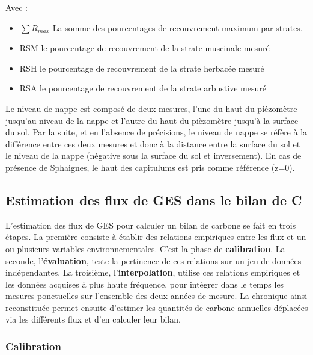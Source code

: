 Avec :
\begin{itemize}
\item $\sum R_{max}$ La somme des pourcentages de recouvrement maximum par strates.
\item RSM le pourcentage de recouvrement de la strate muscinale mesuré
\item RSH le pourcentage de recouvrement de la strate herbacée mesuré
\item RSA le pourcentage de recouvrement de la strate arbustive mesuré
\end{itemize}

Le niveau de nappe est composé de deux mesures, l'une du haut du piézomètre jusqu'au niveau de la nappe et l'autre du haut du pièzomètre jusqu'à la surface du sol. 
Par la suite, et en l'absence de précisions, le niveau de nappe se réfère à la différence entre ces deux mesures et donc à la distance entre la surface du sol et le niveau de la nappe (négative sous la surface du sol et inversement).
En cas de présence de Sphaignes, le haut des capitulums est pris comme référence (z=0).

\subsection{Estimation des flux de GES dans le bilan de C}

L'estimation des flux de GES pour calculer un bilan de carbone se fait en trois étapes.
La première consiste à établir des relations empiriques entre les flux et un ou plusieurs variables environnementales.
C'est la phase de \textbf{calibration}.
La seconde, l'\textbf{évaluation}, teste la pertinence de ces relations sur un jeu de données indépendantes.
La troisième, l'\textbf{interpolation}, utilise ces relations empiriques et les données acquises à plus haute fréquence, pour intégrer dans le temps les mesures ponctuelles sur l'ensemble des deux années de mesure. 
La chronique ainsi reconstituée permet ensuite d'estimer les quantités de carbone annuelles déplacées via les différents flux et d'en calculer leur bilan.

\subsubsection{Calibration}

